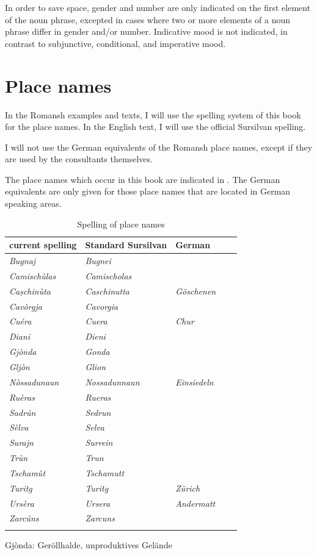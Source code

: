 In order to save space, gender and number are only indicated on the first element of the noun phrase, excepted in cases where two or more elements of a noun phrase differ in gender and/or number. Indicative mood is not indicated, in contrast to subjunctive, conditional, and imperative mood.

\section{Place names}
In the Romansh examples and texts, I will use the spelling system of this book for the place names. In the English text, I will use the official Sursilvan spelling.

I will not use the German equivalents of the Romansh place names, except if they are used by the consultants themselves.

The place names which occur in this book are indicated in . The German equivalents are only given for those place names that are located in German speaking areas.

\begin{table}
	\caption{Spelling of place names}
	\label{spellpln}
	\begin{tabular}{lllll}
\lsptoprule
current spelling &  Standard Sursilvan & German\\
\midrule
\textit{Bugnaj} & \textit{Bugnei}\\
\textit{Camischùlas} & \textit{Camischolas}\\
\textit{Caṣchinùta} & \textit{Caschinutta} & \textit{Göschenen}\\
\textit{Cavòrgja} & \textit{Cavorgia}\\
\textit{Cuéra} & \textit{Cuera} & \textit{Chur}\\
\textit{Diani} & \textit{Dieni}\\
\textit{Gjònda} & \textit{Gonda}\\
\textit{Gljòn} & \textit{Glion}\\
\textit{Nòssadunaun} & \textit{Nossadunnaun} & \textit{Einsiedeln}\\
\textit{Ruèras} & \textit{Rueras}\\
\textit{Sadrún} & \textit{Sedrun}\\
\textit{Sèlva} & \textit{Selva}\\
\textit{Surajn} & \textit{Surrein}\\
\textit{Trùn} & \textit{Trun}\\
\textit{Tschamùt} & \textit{Tschamutt}\\
\textit{Turitg} & \textit{Turitg} & \textit{Zürich}\\
\textit{Ursèra} & \textit{Ursera} & \textit{Andermatt}\\
\textit{Zarcúns} & \textit{Zarcuns}\\
\lspbottomrule
\end{tabular}
\end{table}

Gjònda: Geröllhalde, unproduktives Gelände
